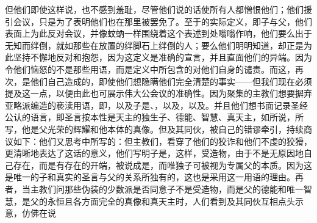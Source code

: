 但他们即使这样说，也不感到羞耻，尽管他们说的话使所有人都憎恨他们；他们援引会议，只是为了表明他们也在那里被罢免了。至于的实际定义，即子与父，他们表面上为此反对会议，并像蚊蚋一样围绕着这个表述到处嗡嗡作响，他们要么出于无知而绊倒，就如那些在放置的绊脚石上绊倒的人；要么他们明明知道，却正是为此坚持不懈地反对和抱怨，因为这定义是准确的宣言，并且直面他们的异端。因为令他们恼怒的不是那些用语，而是定义中所包含的对他们自身的谴责。而这，再次，是他们自己造成的，即使他们想隐瞒他们完全清楚的事实——但我们现在必须提及这一点，以便由此也可展示伟大公会议的准确性。因为聚集的主教们想要摒弃亚略派编造的亵渎用语，即，以及子是、，以及，以及。并且他们想书面记录圣经公认的语言，即圣言按本性是天主的独生子、德能、智慧、真天主，如所说，所写，他是父光荣的辉耀和他本体的真像。但及其同伙，被自己的错谬牵引，持续商议如下：他们又思考中所写的：但主教们，看穿了他们的狡诈和他们不虔的狡猾，更清晰地表达了这话的意义，他们写明子是，这样，受造物，由于不是无原因地自己存在，而是有存在的开端，被说成是，而唯独子可被视为专属父的本质。因为这是唯一的子和真实的圣言与父的关系所独有的，这也是采用这一用语的理由。再者，当主教们问那些伪装的少数派是否同意子不是受造物，而是父的德能和唯一智慧，是父的永恒且各方面完全的真像和真天主时，人们看到及其同伙互相点头示意，仿佛在说\par

\par

